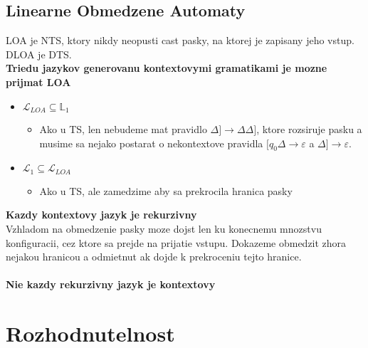 \documentclass[12pt]{article}
\begin{document}
\subsection*{Linearne Obmedzene Automaty}

LOA je NTS, ktory nikdy neopusti cast pasky, na ktorej je zapisany jeho vstup.\\
DLOA je DTS.\\
\textbf{Triedu jazykov generovanu kontextovymi gramatikami je mozne prijmat LOA}
\begin{itemize}
	\item $\mathcal{L}_{LOA} \subseteq \mathbb{L}_{1}$
	\begin{itemize}
		\item Ako u TS, len nebudeme mat pravidlo $\Delta] \to \Delta\Delta]$, ktore rozsiruje pasku a
			musime sa nejako postarat o nekontextove pravidla $[q_{0}\Delta \to \varepsilon$ a $\Delta] \to \varepsilon$.
	\end{itemize}
	\item $\mathcal{L}_{1} \subseteq \mathcal{L}_{LOA}$
	\begin{itemize}
		\item Ako u TS, ale zamedzime aby sa prekrocila hranica pasky
	\end{itemize}
\end{itemize}

\textbf{Kazdy kontextovy jazyk je rekurzivny}\\
Vzhladom na obmedzenie pasky moze dojst len ku konecnemu mnozstvu konfiguracii, cez ktore sa prejde na prijatie vstupu.
Dokazeme obmedzit zhora nejakou hranicou a odmietnut ak dojde k prekroceniu tejto hranice.\\
\\
\textbf{Nie kazdy rekurzivny jazyk je kontextovy}\\

\section{Rozhodnutelnost}
\end{document}
